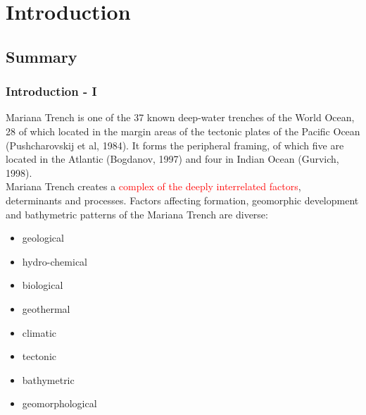 \documentclass[pdflatex,compress,10pt,
	xcolor={dvipsnames,dvipsnames,svgnames,x11names,table},
	hyperref={colorlinks = true,breaklinks = true, urlcolor = NavyBlue, breaklinks = true}]{beamer}
\begin{document}
\section{Introduction}
\subsection{Summary}

\begin{frame}\frametitle{Introduction - I}
Mariana Trench is one of the 37 known deep-water trenches of the World Ocean, 28 of which located in the margin areas of the tectonic plates of the Pacific Ocean (Pushcharovskij et al, 1984). It forms the peripheral framing, of which five are located in the Atlantic (Bogdanov, 1997) and four in Indian Ocean (Gurvich, 1998).\\ Mariana Trench creates a \textcolor{red}{complex of the deeply interrelated factors}, determinants and processes. Factors affecting formation, geomorphic development and bathymetric patterns of the Mariana Trench are diverse:\\
\begin{itemize}
            \item geological 
            \item hydro-chemical
            \item biological
            \item geothermal
            \item climatic
            \item tectonic
            \item bathymetric 
            \item geomorphological
  \end{itemize} 
\end{frame}
\end{document}
